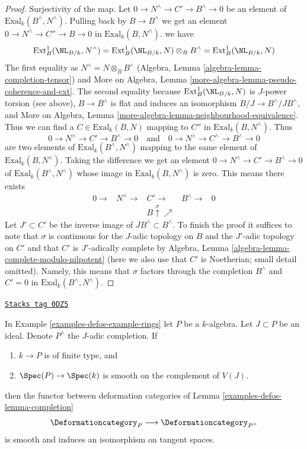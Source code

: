 \begin{proof}
\medskip\noindent
Surjectivity of the map. Let $0 \to N^\wedge \to C' \to B^\wedge \to 0$
be an element of $\text{Exal}_k(B^\wedge, N^\wedge)$.
Pulling back by $B \to B^\wedge$ we get an element
$0 \to N^\wedge \to C'' \to B \to 0$ in
$\text{Exal}_k(B, N^\wedge)$.
we have
$$
\text{Ext}^1_B(\NL_{B/k}, N^\wedge) =
\text{Ext}^1_B(\NL_{B/k}, N) \otimes_B B^\wedge =
\text{Ext}^1_B(\NL_{B/k}, N)
$$
The first equality as $N^\wedge = N \otimes_B B^\wedge$
(Algebra, Lemma \ref{algebra-lemma-completion-tensor})
and
More on Algebra, Lemma \ref{more-algebra-lemma-pseudo-coherence-and-ext}.
The second equality because $\text{Ext}^1_B(\NL_{B/k}, N)$
is $J$-power torsion (see above), $B \to B^\wedge$ is flat and induces
an isomorphism $B/J \to B^\wedge/JB^\wedge$, and
More on Algebra, Lemma \ref{more-algebra-lemma-neighbourhood-equivalence}.
Thus we can find a $C \in \text{Exal}_k(B, N)$ mapping to $C''$ in
$\text{Exal}_k(B, N^\wedge)$.
Thus
$$
0 \to N^\wedge \to C' \to B^\wedge \to 0
\quad\text{and}\quad
0 \to N^\wedge \to C^\wedge \to B^\wedge \to 0
$$
are two elements of $\text{Exal}_k(B^\wedge, N^\wedge)$
mapping to the same element of $\text{Exal}_k(B, N^\wedge)$.
Taking the difference we get an element
$0 \to N^\wedge \to C' \to B^\wedge \to 0$ of
$\text{Exal}_k(B^\wedge, N^\wedge)$
whose image in $\text{Exal}_k(B, N^\wedge)$ is zero.
This means there exists
$$
\begin{array}{ccccc}0 \longrightarrow & N^\wedge \longrightarrow & C' \longrightarrow & B^\wedge \longrightarrow & 0 \\  &  & B \overset{\sigma}{\uparrow}\nearrow &  & \end{array}
$$
Let $J' \subset C'$ be the inverse image of $JB^\wedge \subset B^\wedge$.
To finish the proof it suffices to note that
$\sigma$ is continuous for the $J$-adic topology on $B$
and the $J'$-adic topology on $C'$ and that $C'$ is $J'$-adically complete by
Algebra, Lemma \ref{algebra-lemma-complete-modulo-nilpotent}
(here we also use that $C'$ is Noetherian; small detail omitted).
Namely, this means that $\sigma$ factors through the
completion $B^\wedge$ and $C' = 0$ in $\text{Exal}_k(B^\wedge, N^\wedge)$.
\end{proof}

\begin{lemma}
\label{examples-defos-lemma-smooth-completion}
\href{https://stacks.math.columbia.edu/tag/0DZ5}{\texttt{Stacks tag 0DZ5}}

In Example \ref{examples-defos-example-rings} let $P$ be a $k$-algebra.
Let $J \subset P$ be an ideal.
Denote $P^\wedge$ the $J$-adic completion. If
\begin{enumerate}
\item $k \to P$ is of finite type, and
\item $\Spec(P) \to \Spec(k)$ is smooth on the complement of $V(J)$.
\end{enumerate}
then the functor between deformation categories of
Lemma \ref{examples-defos-lemma-completion}
$$
\Deformationcategory_P \longrightarrow \Deformationcategory_{P^\wedge}
$$
is smooth and induces an isomorphism on tangent spaces.
\end{lemma}

